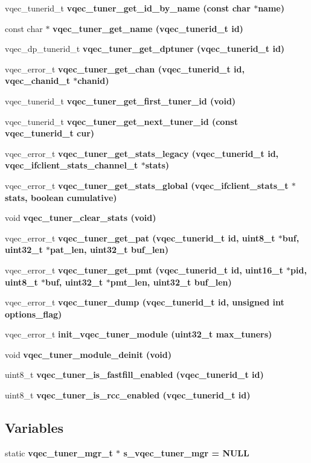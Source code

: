 \begin{CompactItemize}
vqec\_\-tunerid\_\-t \bf{vqec\_\-tuner\_\-get\_\-id\_\-by\_\-name} (const char $\ast$name)
\item 
const char $\ast$ \bf{vqec\_\-tuner\_\-get\_\-name} (vqec\_\-tunerid\_\-t id)
\item 
vqec\_\-dp\_\-tunerid\_\-t \bf{vqec\_\-tuner\_\-get\_\-dptuner} (vqec\_\-tunerid\_\-t id)
\item 
vqec\_\-error\_\-t \bf{vqec\_\-tuner\_\-get\_\-chan} (vqec\_\-tunerid\_\-t id, \bf{vqec\_\-chanid\_\-t} $\ast$chanid)
\item 
vqec\_\-tunerid\_\-t \bf{vqec\_\-tuner\_\-get\_\-first\_\-tuner\_\-id} (void)
\item 
vqec\_\-tunerid\_\-t \bf{vqec\_\-tuner\_\-get\_\-next\_\-tuner\_\-id} (const vqec\_\-tunerid\_\-t cur)
\item 
vqec\_\-error\_\-t \bf{vqec\_\-tuner\_\-get\_\-stats\_\-legacy} (vqec\_\-tunerid\_\-t id, \bf{vqec\_\-ifclient\_\-stats\_\-channel\_\-t} $\ast$stats)
\item 
vqec\_\-error\_\-t \bf{vqec\_\-tuner\_\-get\_\-stats\_\-global} (\bf{vqec\_\-ifclient\_\-stats\_\-t} $\ast$stats, boolean cumulative)
\item 
void \bf{vqec\_\-tuner\_\-clear\_\-stats} (void)
\item 
vqec\_\-error\_\-t \bf{vqec\_\-tuner\_\-get\_\-pat} (vqec\_\-tunerid\_\-t id, uint8\_\-t $\ast$buf, uint32\_\-t $\ast$pat\_\-len, uint32\_\-t buf\_\-len)
\item 
vqec\_\-error\_\-t \bf{vqec\_\-tuner\_\-get\_\-pmt} (vqec\_\-tunerid\_\-t id, uint16\_\-t $\ast$pid, uint8\_\-t $\ast$buf, uint32\_\-t $\ast$pmt\_\-len, uint32\_\-t buf\_\-len)
\item 
vqec\_\-error\_\-t \bf{vqec\_\-tuner\_\-dump} (vqec\_\-tunerid\_\-t id, unsigned int options\_\-flag)
\item 
vqec\_\-error\_\-t \bf{init\_\-vqec\_\-tuner\_\-module} (uint32\_\-t max\_\-tuners)
\item 
void \bf{vqec\_\-tuner\_\-module\_\-deinit} (void)
\item 
uint8\_\-t \bf{vqec\_\-tuner\_\-is\_\-fastfill\_\-enabled} (vqec\_\-tunerid\_\-t id)
\item 
uint8\_\-t \bf{vqec\_\-tuner\_\-is\_\-rcc\_\-enabled} (vqec\_\-tunerid\_\-t id)
\end{CompactItemize}
\subsection*{Variables}
\begin{CompactItemize}
\item 
static \bf{vqec\_\-tuner\_\-mgr\_\-t} $\ast$ \bf{s\_\-vqec\_\-tuner\_\-mgr} = NULL
\end{CompactItemize}


